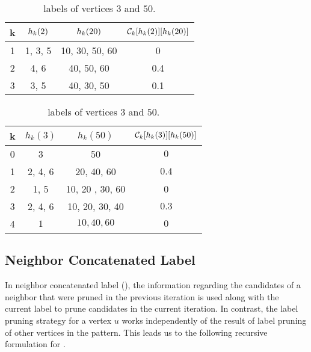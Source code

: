 \begin{table}[h!]
  \vspace{-0.1in}
    \centering
    \begin{tabular}{|c|c|c|c|}
        \hline
        k & $h_{k}(2)$ & $h_{k}(20)$ & $\mathcal{C}_{k}[h_{k}(2)][h_{k}(20)]$\\
        \hline
        1 & 1, 3, 5 & 10, 30, 50, 60 & 0 \\
        2 & 4, 6 & 40, 50, 60 & 0.4 \\
        3 & 3, 5 & 40, 30, 50 & 0.1\\
        \hline
    \end{tabular}
  \vspace{-0.1in}
    \caption{\khop label of vertices $2$ and $20$}
    \label{tab:khop220}
%
    \centering
    \begin{tabular}{|c|c|c|c|}
        \hline
        k & $h_k(3)$ & $h_k(50)$ & $\mathcal{C}_{k}[h_{k}(3)][h_{k}(50)]$ \\
        \hline
        0 & 3 & 50 & $0$\\
        1 & 2, 4, 6 & 20, 40, 60 & $0.4$ \\
        2 & 1, 5 & 10, 20 , 30, 60 & 0\\
        3 & 2, 4, 6 & 10, 20, 30, 40 & $0.3$ \\
        4 & $1$ & $10, 40, 60$ & $0$ \\
        \hline
    \end{tabular}
  \vspace{-0.1in}
    \caption{\khop labels of vertices $3$ and $50$.}
    \label{tab:khop350}
\end{table}



\subsection{Neighbor Concatenated Label} In neighbor concatenated label
(\ncl), the information regarding the candidates of a neighbor that
were pruned in the previous iteration is used along with the current
\khop label to prune candidates in the current iteration. In contrast,
the \khop label pruning strategy for a vertex $u$ works independently of
the result of \khop label pruning of other vertices in the pattern. This
leads us to the following recursive formulation for \ncl.

